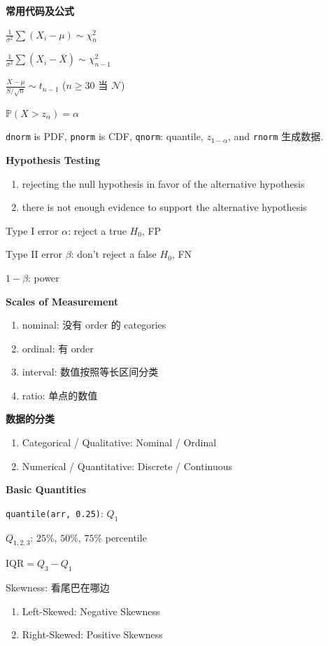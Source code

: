 \documentclass[9pt,landscape]{article}
\begin{document}
\begin{multicols}{3}

\columnseprule=0.25pt

\textbf{常用代码及公式}

$\frac{1}{\sigma^2}\sum(X_i-\mu)\sim\chi^2_n$

$\frac{1}{\sigma^2}\sum(X_i-\overline{X})\sim\chi^2_{n-1}$

$\frac{\overline{X}-\mu}{S/\sqrt{n}}\sim t_{n-1}$ ($n\ge 30$ 当 $\mathcal{N}$)

$\mathbb{P}(X>z_\alpha)=\alpha$

\texttt{dnorm} is PDF, \texttt{pnorm} is CDF, \texttt{qnorm}: quantile, $z_{1-\alpha}$, and \texttt{rnorm} 生成数据.

\textbf{Hypothesis Testing}
\begin{enumerate}
	\item rejecting the null hypothesis in favor of the alternative hypothesis
	\item there is not enough evidence to support the alternative hypothesis
\end{enumerate}

Type I error $\alpha$: reject a true $H_0$, FP

Type II error $\beta$: don't reject a false $H_0$, FN

$1-\beta$: power

\textbf{Scales of Measurement}

\begin{enumerate}
	\item nominal: 没有 order 的 categories
	\item ordinal: 有 order
	\item interval: 数值按照等长区间分类
	\item ratio: 单点的数值
\end{enumerate}

\textbf{数据的分类}
\begin{enumerate}
	\item Categorical / Qualitative: Nominal / Ordinal
	\item Numerical / Quantitative: Discrete / Continuous
\end{enumerate}

\textbf{Basic Quantities}

\texttt{quantile(arr, 0.25)}: $Q_1$

$Q_{1, 2, 3}$: $25\%$, $50\%$, $75\%$ percentile

$\mathrm{IQR}=Q_3-Q_1$

Skewness: 看尾巴在哪边
\begin{enumerate}
	\item Left-Skewed: Negative Skewness
	\item Right-Skewed: Positive Skewness
\end{enumerate}


\end{multicols}
\end{document}
